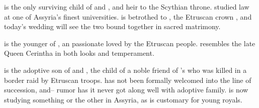 \documentclass[blue]{Kos}
\begin{document}
\cBride{} is the only surviving child of \cScythiaKing{} and \cScythiaQueen{}, and heir to the Scythian throne. \cBride{\They} studied law at one of Assyria's finest universities. \cBride{\They} is betrothed to \cGroom{}, the Etruscan crown \cGroom{\prince}, and today's wedding will see the two bound together in sacred matrimony. 

\cPoet{} is the younger \cPoet{\sibling} of \cGroom{\Prince} \cGroom{}, an passionate \cPoet{\prince} loved by the Etruscan people. \cPoet{\They} resembles the late Queen Cerintha in both looks and temperament.

\cWard{} is the adoptive son of \cScythiaKing{} and \cScythiaQueen{}, the child of a noble friend of \cScythiaQueen{}'s who was killed in a border raid by Etruscan troops. \cWard{\They} has not been formally welcomed into the line of succession, and– rumor has it \cWard{\they} never got along well with \cWard{\their} adoptive family. \cWard{\They} is now studying something or the other in Assyria, as is customary for young royals.
\end{document}
